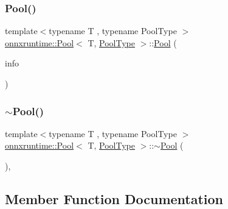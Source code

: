 \subsubsection{\texorpdfstring{Pool()}{Pool()}}
{\footnotesize\ttfamily template$<$typename T , typename Pool\+Type $>$ \\
\mbox{\hyperlink{classonnxruntime_1_1Pool}{onnxruntime\+::\+Pool}}$<$ T, \mbox{\hyperlink{namespaceonnxruntime_aa4ff52f19ea8c4d3e4ce3ffbabbc7060}{Pool\+Type}} $>$\+::\mbox{\hyperlink{classonnxruntime_1_1Pool}{Pool}} (\begin{DoxyParamCaption}\item[{const \mbox{\hyperlink{classonnxruntime_1_1OpKernelInfo}{Op\+Kernel\+Info}} \&}]{info }\end{DoxyParamCaption})\hspace{0.3cm}{\ttfamily [inline]}}

\mbox{\label{classonnxruntime_1_1Pool_a66cabaed967e0f1f6f5e716d3100ca44}} 
\subsubsection{\texorpdfstring{$\sim$\+Pool()}{~Pool()}}
{\footnotesize\ttfamily template$<$typename T , typename Pool\+Type $>$ \\
\mbox{\hyperlink{classonnxruntime_1_1Pool}{onnxruntime\+::\+Pool}}$<$ T, \mbox{\hyperlink{namespaceonnxruntime_aa4ff52f19ea8c4d3e4ce3ffbabbc7060}{Pool\+Type}} $>$\+::$\sim$\mbox{\hyperlink{classonnxruntime_1_1Pool}{Pool}} (\begin{DoxyParamCaption}{ }\end{DoxyParamCaption})\hspace{0.3cm}{\ttfamily [inline]}, {\ttfamily [override]}}



\subsection{Member Function Documentation}
\mbox{\label{classonnxruntime_1_1Pool_afc168d47c3d4a0a67c40bd3e14bd1431}} 
